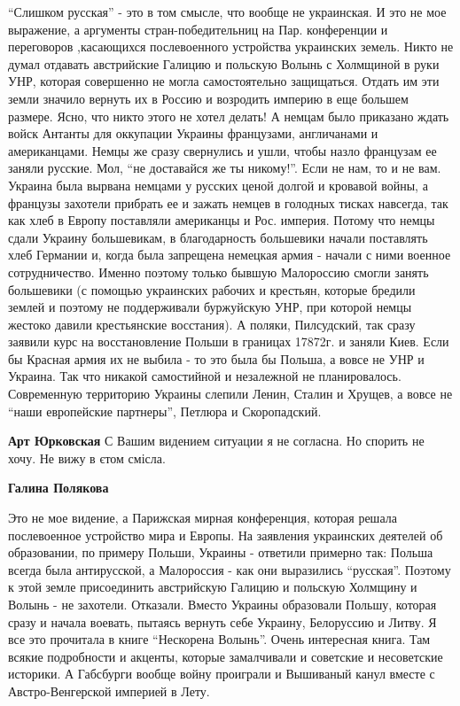 \begin{itemize}
\begin{itemize}
\begin{itemize}
\enquote{Слишком русская} - это в том смысле, что вообще не украинская. И это не мое
выражение, а аргументы стран-победительниц на Пар. конференции и переговоров
,касающихся послевоенного устройства украинских земель. Никто не думал отдавать
австрийские Галицию и польскую Волынь с Холмщиной в руки УНР, которая совершенно
не могла самостоятельно защищаться. Отдать им эти земли значило вернуть их в
Россию и возродить империю в еще большем размере. Ясно, что никто этого не хотел
делать! А немцам было приказано ждать войск Антанты для оккупации Украины
французами, англичанами и американцами. Немцы же сразу свернулись и ушли, чтобы
назло французам ее заняли русские. Мол, \enquote{не доставайся же ты никому!}. Если не
нам, то и не вам. Украина была вырвана немцами у русских ценой долгой и кровавой
войны, а французы захотели прибрать ее и зажать немцев в голодных тисках
навсегда, так как хлеб в Европу поставляли американцы и Рос. империя. Потому что
немцы сдали Украину большевикам, в благодарность большевики начали поставлять
хлеб Германии и, когда была запрещена немецкая армия - начали с ними военное
сотрудничество. Именно поэтому только бывшую Малороссию смогли занять
большевики (с помощью украинских рабочих и крестьян, которые бредили землей и
поэтому не поддерживали буржуйскую УНР, при которой немцы жестоко давили
крестьянские восстания). А поляки, Пилсудский, так сразу заявили курс на
восстановление Польши в границах 17872г. и заняли Киев. Если бы Красная армия их
не выбила - то это была бы Польша, а вовсе не УНР и Украина. Так что никакой
самостийной и незалежной не планировалось. Современную территорию Украины
слепили Ленин, Сталин и Хрущев, а вовсе не \enquote{наши европейские партнеры}, Петлюра и
Скоропадский.


\textbf{Арт Юрковская} С Вашим видением ситуации я не согласна. Но спорить не хочу. Не вижу в єтом смісла.

\textbf{Галина Полякова} 

Это не мое видение, а Парижская мирная конференция, которая решала послевоенное
устройство мира и Европы. На заявления украинских деятелей об образовании, по
примеру Польши, Украины - ответили примерно так: Польша всегда была
антирусской, а Малороссия - как они выразились \enquote{русская}. Поэтому к этой земле
присоединить австрийскую Галицию и польскую Холмщину и Волынь - не
захотели. Отказали. Вместо Украины образовали Польшу, которая сразу и начала
воевать, пытаясь вернуть себе Украину, Белоруссию и Литву. Я все это прочитала в
книге \enquote{Нескорена Волынь}. Очень интересная книга. Там всякие подробности и
акценты, которые замалчивали и советские и несоветские историки. А Габсбурги
вообще войну проиграли и Вышиваный канул вместе с Австро-Венгерской империей в
Лету.


\end{itemize}
\end{itemize}
\end{itemize}
